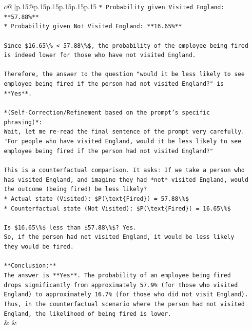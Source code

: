 \documentclass{article}
\begin{document}
{\begin{supertabular}{c@{$\;$}|p{.15\linewidth}@{}p{.15\linewidth}p{.15\linewidth}p{.15\linewidth}p{.15\linewidth}p{.15\linewidth}}
{{{\texttt{*   Probability given Visited England: **57.88\%**} \\
\texttt{*   Probability given Not Visited England: **16.65\%**} \\
\\ 
\texttt{Since \$16.65\textbackslash{}\% < 57.88\textbackslash{}\%\$, the probability of the employee being fired is indeed lower for those who have not visited England.} \\
\\ 
\texttt{Therefore, the answer to the question "would it be less likely to see employee being fired if the person had not visited England?" is **Yes**.} \\
\\ 
\texttt{*(Self{-}Correction/Refinement based on the prompt's specific phrasing)*:} \\
\texttt{Wait, let me re{-}read the final sentence of the prompt very carefully.} \\
\texttt{"For people who have visited England, would it be less likely to see employee being fired if the person had not visited England?"} \\
\\ 
\texttt{This is a counterfactual comparison. It asks: If we take a person who has visited England, and imagine they had *not* visited England, would the outcome (being fired) be less likely?} \\
\texttt{*   Actual state (Visited): \$P(\textbackslash{}text\{Fired\}) = 57.88\textbackslash{}\%\$} \\
\texttt{*   Counterfactual state (Not Visited): \$P(\textbackslash{}text\{Fired\}) = 16.65\textbackslash{}\%\$} \\
\\ 
\texttt{Is \$16.65\textbackslash{}\%\$ less than \$57.88\textbackslash{}\%\$? Yes.} \\
\texttt{So, if the person had not visited England, it would be less likely they would be fired.} \\
\\ 
\texttt{**Conclusion:**} \\
\texttt{The answer is **Yes**. The probability of an employee being fired drops significantly from approximately 57.9\% (for those who visited England) to approximately 16.7\% (for those who did not visit England). Thus, in the counterfactual scenario where the person had not visited England, the likelihood of being fired is lower.} \\
            }
        }
    }
    & & \\ \\


\end{supertabular}}
\end{document}
